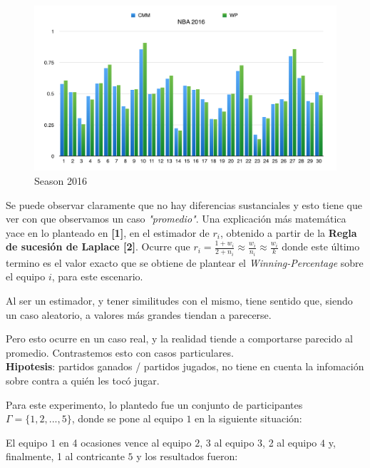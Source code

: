 \begin{figure}[h!]
  \begin{center}
	\includegraphics[scale=0.50]{imagenes/cualitative/comparative/nba2016.png}
	\caption{Season 2016}
  \end{center}
\end{figure}

Se puede observar claramente que no hay diferencias sustanciales y esto tiene que ver con que observamos un caso \textit{"promedio"}. Una explicaci\'on m\'as matem\'atica yace en lo planteado en \textbf{[1]}, en el estimador de $r_{i}$, obtenido a partir de la \textbf{Regla de sucesi\'on de Laplace [2]}. Ocurre que $r_{i} = \frac{1 + w_{i}}{2 + n_{i}} \approx \frac{w_{i}}{n_{i}} \approx \frac{w_{i}}{k}$ donde este \'ultimo termino es el valor exacto que se obtiene de plantear el \textit{Winning-Percentage} sobre el equipo $i$, para este escenario. 

Al ser un estimador, y tener similitudes con el mismo, tiene sentido que, siendo un caso aleatorio, a valores m\'as grandes tiendan a parecerse.

Pero esto ocurre en un caso real, y la realidad tiende a comportarse parecido al promedio. Contrastemos esto con casos particulares. \\

\textbf{Hipotesis}: partidos ganados / partidos jugados, no tiene en cuenta la infomaci\'on sobre contra a qui\'en les toc\'o jugar.

Para este experimento, lo plantedo fue un conjunto de participantes $\Gamma = \{1,2,...,5\}$, donde se pone al equipo $1$ en la siguiente situaci\'on:

El equipo $1$ en 4 ocasiones vence al equipo $2$, 3 al equipo $3$, 2 al equipo $4$ y, finalmente, 1 al contricante $5$ y los resultados fueron: \\

